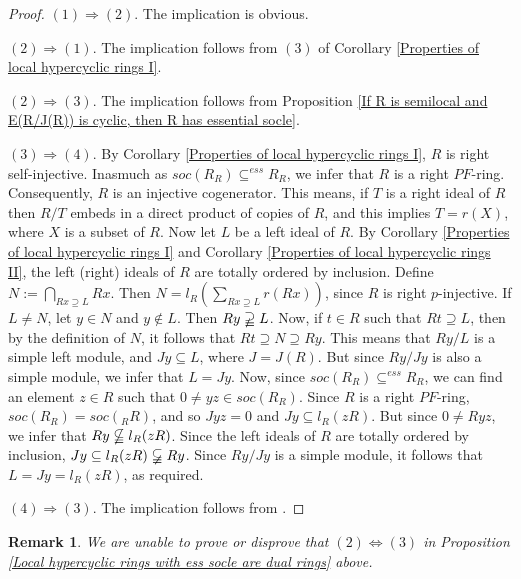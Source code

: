 \documentclass{amsart}
\theoremstyle{plain}
\newtheorem{remark}[theorem]{Remark}
\numberwithin{equation}{section}
\begin{document}
\begin{proof}
$(1) \Rightarrow (2)$. The implication is obvious. 

$(2) \Rightarrow (1)$. The implication follows from $(3)$ of Corollary \ref{Properties of local hypercyclic rings I}. 

$(2) \Rightarrow (3)$. The implication follows from Proposition \ref{If R is semilocal and E(R/J(R)) is cyclic, then R has essential socle}. 

$(3) \Rightarrow (4)$. By Corollary \ref{Properties of local hypercyclic rings I}, $R$ is right self-injective. Inasmuch as $s o c (R_{R})  \subseteq ^{e s s}R_{R}$, we infer that $R$ is a right $P F$-ring. Consequently, $R$ is an injective cogenerator. This means, if $T$ is a right ideal of $R$ then $R/T$ embeds in a direct product of copies of $R$, and this implies $T =r (X)$, where $X$ is a subset of $R$. Now let $L$ be a left ideal of $R$. By Corollary \ref{Properties of local hypercyclic rings I} and
Corollary \ref{Properties of local hypercyclic rings II}, the left (right) ideals
of $R$ are totally ordered by inclusion. Define $N:=\bigcap _{R x \supseteq L}R x$. Then $N =l_{R} (\sum _{R x \supseteq L}r (R x))$, since $R$ is right $p$-injective. If $L \neq N$, let $y \in N$ and $y \notin L$. Then $R y\varsupsetneqq L$. Now, if $t \in R$ such that $R t \supseteq L$, then by the definition of $N$, it follows that $R t \supseteq N \supseteq R y$. This means that $R y/L$ is a simple left module, and $J y \subseteq L$, where $J =J (R)$. But since $R y/J y$ is also a simple module, we infer that $L =J y$. Now, since $s o c (R_{R})  \subseteq ^{e s s}R_{R}$, we can find an element $z \in R$ such that $0 \neq y z \in s o c (R_{R})$. Since $R$ is a right $P F$-ring, $s o c (R_{R}) =s o c (_{R} R)$, and so $J y z =0$ and $J y \subseteq l_{R} (z R)$. But since $0 \neq R y z$, we infer that $R y\nsubseteqq l_{R} (z R)$. Since the left ideals of $R$ are totally ordered by inclusion, $J y \subseteq l_{R} (z R)\varsubsetneqq R y$. Since $R y/J y$ is a simple module, it follows that $L =J y =l_{R} (z R)$, as required. 

$(4) \Rightarrow (3)$. The implication follows from \cite[Lemma 3.2 and
Theorem 3.5]{HN}. 
\end{proof}


\begin{remark}
We are unable to prove or disprove that $(2) \Leftrightarrow (3)$ in Proposition \ref{Local hypercyclic rings with ess socle are dual rings}
above. 
\end{remark}
\end{document}
